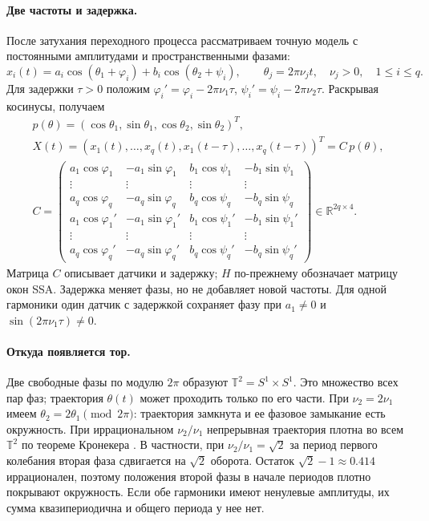 \documentclass[11pt,a4paper]{article}
\begin{document}
\paragraph{Две частоты и задержка.}
После затухания переходного процесса рассматриваем точную модель
с постоянными амплитудами и пространственными фазами:
\[
 x_i(t)=a_i\cos(\theta_1+\varphi_i)
       +b_i\cos(\theta_2+\psi_i),\qquad
 \theta_j=2\pi\nu_jt,\quad \nu_j>0,\quad 1\leq i\leq q.
\]
Для задержки $\tau>0$ положим
$\varphi_i'=\varphi_i-2\pi\nu_1\tau$,
$\psi_i'=\psi_i-2\pi\nu_2\tau$. Раскрывая косинусы, получаем
\begin{gather*}
 p(\theta)=(\cos\theta_1,\sin\theta_1,
             \cos\theta_2,\sin\theta_2)^T,\\
 X(t)=(x_1(t),\ldots,x_q(t),x_1(t-\tau),\ldots,x_q(t-\tau))^T
     =C\,p(\theta),\\
 C=\begin{pmatrix}
 a_1\cos\varphi_1&-a_1\sin\varphi_1&b_1\cos\psi_1&-b_1\sin\psi_1\\
 \vdots&\vdots&\vdots&\vdots\\
 a_q\cos\varphi_q&-a_q\sin\varphi_q&b_q\cos\psi_q&-b_q\sin\psi_q\\
 a_1\cos\varphi_1'&-a_1\sin\varphi_1'&b_1\cos\psi_1'&-b_1\sin\psi_1'\\
 \vdots&\vdots&\vdots&\vdots\\
 a_q\cos\varphi_q'&-a_q\sin\varphi_q'&b_q\cos\psi_q'&-b_q\sin\psi_q'
 \end{pmatrix}\in\mathbb R^{2q\times4}.
\end{gather*}
Матрица $C$ описывает датчики и задержку; $H$ по-прежнему обозначает
матрицу окон SSA. Задержка меняет фазы, но не добавляет новой частоты.
Для одной гармоники один датчик с задержкой сохраняет фазу
при $a_1\ne0$ и $\sin(2\pi\nu_1\tau)\ne0$.

\paragraph{Откуда появляется тор.}
Две свободные фазы по модулю $2\pi$ образуют
$\mathbb T^2=S^1\times S^1$. Это множество всех пар фаз;
траектория $\theta(t)$ может проходить только по его части.
При $\nu_2=2\nu_1$ имеем $\theta_2=2\theta_1\pmod{2\pi}$:
траектория замкнута и ее фазовое замыкание есть окружность.
При иррациональном $\nu_2/\nu_1$ непрерывная траектория плотна
во всем $\mathbb T^2$ по теореме Кронекера
\cite[теорема 2.1]{torus}. В частности, при $\nu_2/\nu_1=\sqrt2$
за период первого колебания вторая фаза сдвигается на $\sqrt2$ оборота.
Остаток $\sqrt2-1\approx0.414$ иррационален, поэтому положения
второй фазы в начале периодов плотно покрывают окружность.
Если обе гармоники имеют ненулевые амплитуды, их сумма квазипериодична
и общего периода у нее нет.
\end{document}
